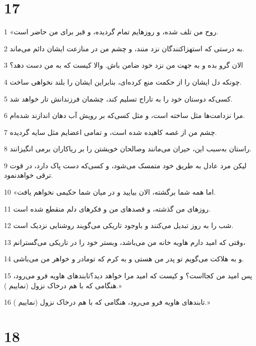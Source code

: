\chapter{17}

\par 1 «روح من تلف شده، و روزهایم تمام گردیده، و قبر برای من حاضر است.
\par 2 به درستی که استهزاکنندگان نزد منند، و چشم من در منازعت ایشان دائم می‌ماند.
\par 3 الان گرو بده و به جهت من نزد خود ضامن باش. والا کیست که به من دست دهد؟
\par 4 چونکه دل ایشان را از حکمت منع کرده‌ای، بنابراین ایشان را بلند نخواهی ساخت.
\par 5 کسی‌که دوستان خود را به تاراج تسلیم کند، چشمان فرزندانش تار خواهد شد.
\par 6 مرا نزدامت‌ها مثل ساخته است، و مثل کسی‌که بر رویش آب دهان اندازند شده‌ام.
\par 7 چشم من از غصه کاهیده شده است، و تمامی اعضایم مثل سایه گردیده.
\par 8 راستان به‌سبب این، حیران می‌مانند وصالحان خویشتن را بر ریاکاران برمی انگیزانند.
\par 9 لیکن مرد عادل به طریق خود متمسک می‌شود، و کسی‌که دست پاک دارد، در قوت ترقی خواهدنمود.
\par 10 «اما همه شما برگشته، الان بیایید و در میان شما حکیمی نخواهم یافت.
\par 11 روزهای من گذشته، و قصدهای من و فکرهای دلم منقطع شده است.
\par 12 شب را به روز تبدیل می‌کنند و باوجود تاریکی می‌گویند روشنایی نزدیک است.
\par 13 وقتی که امید دارم هاویه خانه من می‌باشد، وبستر خود را در تاریکی می‌گسترانم،
\par 14 و به هلاکت می‌گویم تو پدر من هستی و به کرم که تومادر و خواهر من می‌باشی.
\par 15 پس امید من کجااست؟ و کیست که امید مرا خواهد دید؟تابندهای هاویه فرو می‌رود، هنگامی که با هم درخاک نزول (نماییم ).»
\par 16 تابندهای هاویه فرو می‌رود، هنگامی که با هم درخاک نزول (نماییم ).»
 
\chapter{18}

